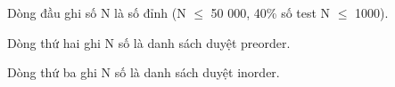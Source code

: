 Dòng đầu ghi số N là số đỉnh (N  $\le$  50 000, 40\% số test N  $\le$  1000).

Dòng thứ hai ghi N số là danh sách duyệt preorder.

Dòng thứ ba ghi N số là danh sách duyệt inorder.